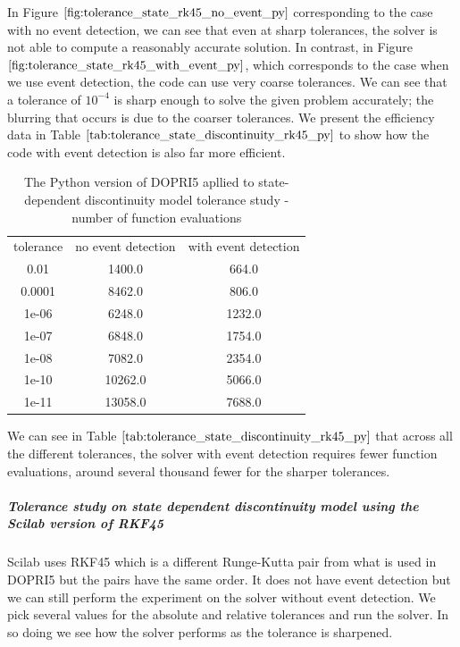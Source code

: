 In Figure $\ref{fig:tolerance_state_rk45_no_event_py}$ corresponding to the case with no event detection, we can see that even at sharp tolerances, the solver is not able to compute a reasonably accurate solution. In contrast, in Figure $\ref{fig:tolerance_state_rk45_with_event_py}$, which corresponds to the case when we use event detection, the code can use very coarse tolerances. We can see that a tolerance of $10^{-4}$ is sharp enough to solve the given problem accurately; the blurring that occurs is due to the coarser tolerances. We present the efficiency data in Table $\ref{tab:tolerance_state_discontinuity_rk45_py}$ to show how the code with event detection is also far more efficient.

\begin{table}[h]
\caption {The Python version of DOPRI5 apllied to state-dependent discontinuity model tolerance study - number of function evaluations} \label{tab:tolerance_state_discontinuity_rk45_py} 
\begin{center}
\begin{tabular}{ c c c }
tolerance & no event detection & with event detection \\
0.01 & 1400.0 & 664.0 \\
0.0001 & 8462.0 & 806.0 \\
1e-06 & 6248.0 & 1232.0 \\
1e-07 & 6848.0 & 1754.0 \\
1e-08 & 7082.0 & 2354.0 \\
1e-10 & 10262.0 & 5066.0 \\
1e-11 & 13058.0 & 7688.0 \\
\end{tabular}
\end{center}
\end{table}

We can see in Table $\ref{tab:tolerance_state_discontinuity_rk45_py}$ that across all the different tolerances, the solver with event detection requires fewer function evaluations, around several thousand fewer for the sharper tolerances. 

\subparagraph{Tolerance study on state dependent discontinuity model using the Scilab version of RKF45}
Scilab uses RKF45 which is a different Runge-Kutta pair from what is used in DOPRI5 but the pairs have the same order. It does not have event detection but we can still perform the experiment on the solver without event detection. We pick several values for the absolute and relative tolerances and run the solver. In so doing we see how the solver performs as the tolerance is sharpened. 

